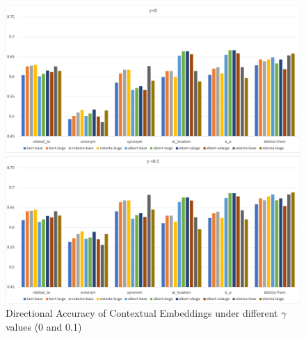 \documentclass[letterpaper]{article} %
\begin{document}
\begin{figure}[!]
\centering

\begin{minipage}[b]{\textwidth}
  \includegraphics[width=\linewidth]{dir_gamma0.png}
\end{minipage}
\hfill

\begin{minipage}[b]{\textwidth}
  \includegraphics[width=\linewidth]{dir_gamma0.1.png}
\end{minipage}
\caption{Directional Accuracy of Contextual Embeddings under different $\gamma$ values (0 and 0.1)}
\label{fig:dirgamma1}
\end{figure}
\end{document}
